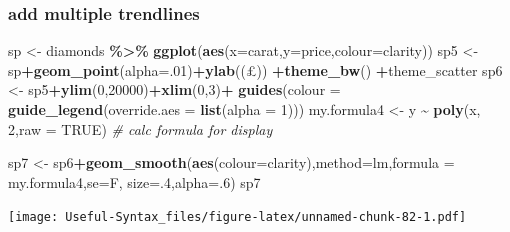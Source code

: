 \documentclass[
]{article}
\newenvironment{Shaded}{\begin{snugshade}}{\end{snugshade}}
\newcommand{\AttributeTok}[1]{\textcolor[rgb]{0.13,0.29,0.53}{#1}}
\newcommand{\CommentTok}[1]{\textcolor[rgb]{0.56,0.35,0.01}{\textit{#1}}}
\newcommand{\ConstantTok}[1]{\textcolor[rgb]{0.56,0.35,0.01}{#1}}
\newcommand{\DecValTok}[1]{\textcolor[rgb]{0.00,0.00,0.81}{#1}}
\newcommand{\FunctionTok}[1]{\textcolor[rgb]{0.13,0.29,0.53}{\textbf{#1}}}
\newcommand{\NormalTok}[1]{#1}
\newcommand{\OtherTok}[1]{\textcolor[rgb]{0.56,0.35,0.01}{#1}}
\newcommand{\SpecialCharTok}[1]{\textcolor[rgb]{0.81,0.36,0.00}{\textbf{#1}}}
\newcommand{\StringTok}[1]{\textcolor[rgb]{0.31,0.60,0.02}{#1}}
\begin{document}
\hypertarget{add-multiple-trendlines}{%
\subsubsection{add multiple trendlines}\label{add-multiple-trendlines}}

\begin{Shaded}
\begin{Highlighting}[]
\NormalTok{sp }\OtherTok{\textless{}{-}}\NormalTok{ diamonds }\SpecialCharTok{\%\textgreater{}\%} \FunctionTok{ggplot}\NormalTok{(}\FunctionTok{aes}\NormalTok{(}\AttributeTok{x=}\NormalTok{carat,}\AttributeTok{y=}\NormalTok{price,}\AttributeTok{colour=}\NormalTok{clarity))}
\NormalTok{sp5 }\OtherTok{\textless{}{-}}\NormalTok{ sp}\SpecialCharTok{+}\FunctionTok{geom\_point}\NormalTok{(}\AttributeTok{alpha=}\NormalTok{.}\DecValTok{01}\NormalTok{)}\SpecialCharTok{+}\FunctionTok{ylab}\NormalTok{(}\StringTok{\textquotesingle{}(£)\textquotesingle{}}\NormalTok{) }\SpecialCharTok{+}\FunctionTok{theme\_bw}\NormalTok{() }\SpecialCharTok{+}\NormalTok{theme\_scatter}
\NormalTok{sp6 }\OtherTok{\textless{}{-}}\NormalTok{ sp5}\SpecialCharTok{+}\FunctionTok{ylim}\NormalTok{(}\DecValTok{0}\NormalTok{,}\DecValTok{20000}\NormalTok{)}\SpecialCharTok{+}\FunctionTok{xlim}\NormalTok{(}\DecValTok{0}\NormalTok{,}\DecValTok{3}\NormalTok{)}\SpecialCharTok{+} \FunctionTok{guides}\NormalTok{(}\AttributeTok{colour =} \FunctionTok{guide\_legend}\NormalTok{(}\AttributeTok{override.aes =} \FunctionTok{list}\NormalTok{(}\AttributeTok{alpha =} \DecValTok{1}\NormalTok{)))}
\NormalTok{my.formula4 }\OtherTok{\textless{}{-}}\NormalTok{ y }\SpecialCharTok{\textasciitilde{}} \FunctionTok{poly}\NormalTok{(x, }\DecValTok{2}\NormalTok{,}\AttributeTok{raw =} \ConstantTok{TRUE}\NormalTok{) }\CommentTok{\# calc formula for display}

\NormalTok{sp7 }\OtherTok{\textless{}{-}}\NormalTok{ sp6}\SpecialCharTok{+}\FunctionTok{geom\_smooth}\NormalTok{(}\FunctionTok{aes}\NormalTok{(}\AttributeTok{colour=}\NormalTok{clarity),}\AttributeTok{method=}\StringTok{\textquotesingle{}lm\textquotesingle{}}\NormalTok{,}\AttributeTok{formula =}\NormalTok{ my.formula4,}\AttributeTok{se=}\NormalTok{F, }\AttributeTok{size=}\NormalTok{.}\DecValTok{4}\NormalTok{,}\AttributeTok{alpha=}\NormalTok{.}\DecValTok{6}\NormalTok{)}
\NormalTok{sp7}
\end{Highlighting}
\end{Shaded}

\texttt{[image: Useful-Syntax\_files/figure-latex/unnamed-chunk-82-1.pdf]}
\end{document}
